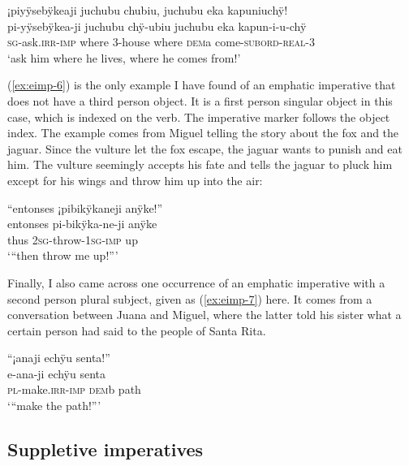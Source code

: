 \ea\label{ex:eimp-5}
\begingl
\glpreamble ¡piyÿsebÿkeaji juchubu chubiu, juchubu eka kapuniuchÿ!\\
\gla pi-yÿsebÿkea-ji juchubu chÿ-ubiu juchubu eka kapun-i-u-chÿ\\
\textsc{sg}-ask.\textsc{irr}-\textsc{imp} where 3-house where \textsc{dem}a come-\textsc{subord}-\textsc{real}-3\\
\glft ‘ask him where he lives, where he comes from!’
\endgl
\trailingcitation{[mty-p110906l.211-212]}
\xe

(\ref{ex:eimp-6}) is the only example I have found of an emphatic imperative that does not have a third person object. It is a first person singular object in this case, which is indexed on the verb. The imperative marker follows the object index. The example comes from Miguel telling the story about the fox and the jaguar. Since the vulture let the fox escape, the jaguar wants to punish and eat him. The vulture seemingly accepts his fate and tells the jaguar to pluck him except for his wings and throw him up into the air:

\ea\label{ex:eimp-6}
\begingl
\glpreamble “entonses ¡pibikÿkaneji anÿke!”\\
\gla entonses pi-bikÿka-ne-ji anÿke\\
\glb thus 2\textsc{sg}-throw-1\textsc{sg}-\textsc{imp} up\\
\glft ‘“then throw me up!”’
\endgl
\trailingcitation{[jmx-n120429ls-x5.195]}
\xe

Finally, I also came across one occurrence of an emphatic imperative with a second person plural subject, given as (\ref{ex:eimp-7}) here. It comes from a conversation between Juana and Miguel, where the latter told his sister what a certain person had said to the people of Santa Rita.

\ea\label{ex:eimp-7}
\begingl
\glpreamble “¡anaji echÿu senta!”\\
\gla e-ana-ji echÿu senta\\
\textsc{pl}-make.\textsc{irr}-\textsc{imp} \textsc{dem}b path\\
\glft ‘“make the path!”’
\endgl
\trailingcitation{[jmx-c120429ls-x5.063]}
\xe
{}

\subsection{Suppletive imperatives}\label{sec:SuppletiveImperatives}

